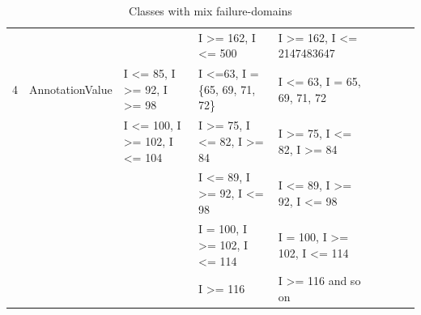 \documentclass[runningheads,a4paper]{llncs}
\begin{document}
\begin{table}[h]
{{\begin{tabular}{|l|l|l|l|l|l|l|l|l|}
	&                               			& 										& I \textgreater= 162, I \textless= 500							& I \textgreater= 162, I \textless= 2147483647						   	    \\	
4	& AnnotationValue			& I \textless= 85, I \textgreater= 92, I \textgreater= 98		& I \textless=63, I = \{65, 69, 71, 72\}			& I \textless= 63, I = {65, 69, 71, 72}										     \\
	&                              			& I \textless= 100, I \textgreater= 102, I \textless= 104	& I \textgreater= 75, I \textless= 82, I \textgreater= 84	& I \textgreater= 75, I \textless= 82, I \textgreater= 84 					     \\	
	&                               			& 										& I \textless= 89, I \textgreater= 92, I \textless= 98			& I \textless= 89, I \textgreater= 92, I \textless= 98 	\\	
	&                               			& 										& I = 100, I \textgreater= 102, I \textless= 114					& I = 100, I \textgreater= 102, I \textless= 114 		\\	
	&                               			& 										& I \textgreater= 116											& I \textgreater= 116 and so on  						\\	


	
\hline
\end{tabular}
}
}
\bigskip
\caption{Classes with mix failure-domains}
\label{table:mixDomains}
\end{table}
\end{document}
